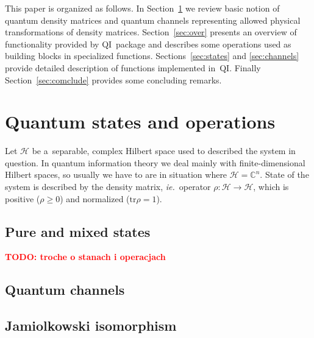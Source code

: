 \documentclass[final,5p,times]{elsarticle}
\newcommand{\1}{{\rm 1\hspace{-0.9mm}l}}
\newcommand{\tr}{\mathrm{tr}}
\newcommand{\qi}{QI}
\newcommand{\HS}[1]{\ensuremath{\mathcal{#1}}} %
\newcommand{\Cplx}{\ensuremath{\mathbb{C}}}
\newcommand{\ie}{\emph{ie.}}
\newcommand{\todo}[1]{\textcolor{red}{\bf TODO: #1}}
\begin{document}
This paper is organized as follows. In Section~\ref{sec:qi-intro} we review
basic notion of quantum density matrices and quantum channels representing
allowed physical transformations of density matrices. Section~\ref{sec:over}
presents an overview of functionality provided by \qi\ package and describes
some operations used as building blocks in specialized functions.
Sections~\ref{sec:states} and \ref{sec:channels} provide detailed description of
functions implemented in~\qi. Finally Section~\ref{sec:comclude} provides some
concluding remarks.

\section{Quantum states and operations}\label{sec:qi-intro}
Let $\HS{H}$ be a~separable, complex Hilbert space used to described the system
in question. In quantum information theory we deal mainly with
finite-dimensional Hilbert spaces, so usually we have to are in situation where
$\HS{H}=\Cplx^n$. State of the system is described by the density matrix, \ie\
operator $\rho:\HS{H}\rightarrow\HS{H}$, which is positive ($\rho\geq0$) and
normalized ($\tr{\rho}=1$). 

\subsection{Pure and mixed states}
\todo{troche o stanach i operacjach}


\subsection{Quantum channels}



\subsection{Jamiolkowski isomorphism}
\end{document}
